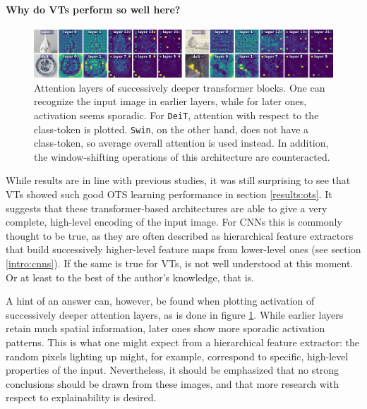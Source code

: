 \paragraph{Why do VTs perform so well here?}

\begin{figure}[tb]
    \includegraphics[width=\textwidth]{img/layers.png}
    \caption{Attention layers of successively deeper transformer blocks. One can recognize the input image in earlier layers, while for later ones, activation seems sporadic. For \texttt{DeiT}, attention with respect to the class-token is plotted. \texttt{Swin}, on the other hand, does not have a class-token, so average overall attention is used instead. In addition, the window-shifting operations of this architecture are counteracted.}
    \label{results:img:layers}
\end{figure}

While results are in line with previous studies, it was still surprising to see that VTs showed such good OTS learning performance in section \ref{results:ots}. It suggests that these transformer-based architectures are able to give a very complete, high-level encoding of the input image. For CNNs this is commonly thought to be true, as they are often described as hierarchical feature extractors that build successively higher-level feature maps from lower-level ones (see section \ref{intro:cnns}). If the same is true for VTs, is not well understood at this moment. Or at least to the best of the author's knowledge, that is.

A hint of an answer can, however, be found when plotting activation of successively deeper attention layers, as is done in figure \ref{results:img:layers}. While earlier layers retain much spatial information, later ones show more sporadic activation patterns. This is what one might expect from a hierarchical feature extractor: the random pixels lighting up might, for example, correspond to specific, high-level properties of the input. Nevertheless, it should be emphasized that no strong conclusions should be drawn from these images, and that more research with respect to explainability is desired.

